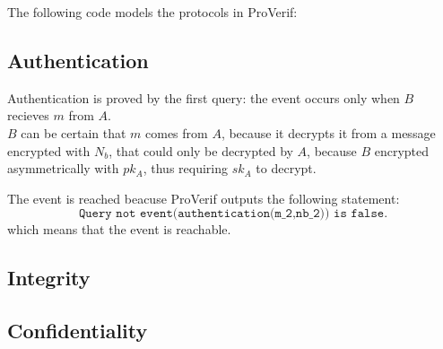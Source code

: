The following code models the protocols in ProVerif:



\subsection{Authentication}
Authentication is proved by the first query: the event occurs only when $B$ recieves $m$ from $A$. \\
$B$ can be certain that $m$ comes from $A$, because it decrypts it from a message encrypted with $N_b$, that could only be decrypted by $A$, because $B$ encrypted asymmetrically with $pk_A$, thus requiring $sk_A$ to decrypt.

\noindent
The event is reached beacuse ProVerif outputs the following statement:
$$
\texttt{Query not event(authentication(m\_2,nb\_2)) is false.}
$$
which means that the event is reachable.

\subsection{Integrity}

\subsection{Confidentiality}
